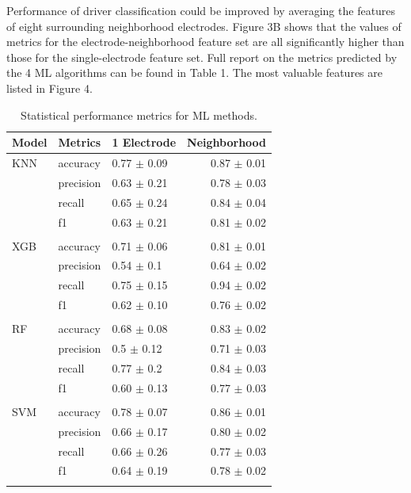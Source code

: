 \documentclass{article}
\begin{document}
Performance of driver classification could be improved by averaging the features of eight surrounding neighborhood electrodes. Figure 3B shows that the values of metrics for the electrode-neighborhood feature set are all significantly higher than those for the single-electrode feature set. Full report on the metrics predicted by the 4 ML algorithms can be found in Table 1. The most valuable features are listed in Figure 4. 

\begin{table}[t]
\caption{Statistical performance metrics for ML methods.}
\label{sample-table}
\vskip 0.15in
\begin{center}
\begin{small}
\begin{sc}
\begin{tabular}{l{1cm}p{2cm}p{2cm}r{2cm}}
\toprule
Model &Metrics &1 Electrode &Neighborhood\\
\midrule
KNN        &accuracy  &0.77 $\pm$ 0.09& 0.87 $\pm$ 0.01\\
&precision &0.63 $\pm$ 0.21 &0.78 $\pm$ 0.03\\
&recall    &0.65 $\pm$ 0.24 &0.84 $\pm$ 0.04\\
&f1        &0.63 $\pm$ 0.21 &0.81 $\pm$ 0.02\\\\

XGB    &accuracy  &0.71 $\pm$ 0.06 &0.81 $\pm$ 0.01\\
&precision &0.54 $\pm$ 0.1  &0.64 $\pm$ 0.02\\
&recall    &0.75 $\pm$ 0.15 &0.94 $\pm$ 0.02\\
&f1        &0.62 $\pm$ 0.10 &0.76 $\pm$ 0.02\\\\

RF         &accuracy  &0.68 $\pm$ 0.08 &0.83 $\pm$ 0.02\\
&precision &0.5  $\pm$ 0.12 &0.71 $\pm$ 0.03\\
&recall    &0.77 $\pm$ 0.2  &0.84 $\pm$ 0.03\\
&f1        &0.60 $\pm$ 0.13 &0.77 $\pm$ 0.03\\\\

SVM        &accuracy  &0.78 $\pm$ 0.07 &0.86 $\pm$ 0.01\\
&precision &0.66 $\pm$ 0.17 &0.80 $\pm$ 0.02\\
&recall    &0.66 $\pm$ 0.26 &0.77 $\pm$ 0.03\\
&f1        &0.64 $\pm$ 0.19 &0.78 $\pm$ 0.02\\\\


\end{tabular}
\end{sc}
\end{small}
\end{center}
\end{table}
\end{document}
